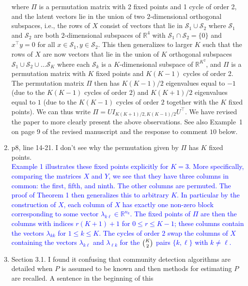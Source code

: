 \documentclass[
]{article}
\begin{document}
\begin{enumerate}
{  where $\Pi$ is a permutation matrix with 2 fixed points and 1 cycle of
  order 2, and the latent vectors lie in the union of two $2$-dimensional
  orthogonal subspaces, i.e., the rows of $X$ consist of
  vectors that lie in $\mathcal{S}_1 \cup \mathcal{S}_2$ where
  $\mathcal{S}_1$ and $\mathcal{S}_2$ are both $2$-dimensional
  subspaces of $\mathbb{R}^{4}$ with $\mathcal{S}_1 \cap \mathcal{S}_2 = \{0\}$ and $x^{\top} y
  = 0$ for all $x \in \mathcal{S}_1, y \in \mathcal{S}_2$. 
  This then generalizes to larger $K$ such that the rows of $X$ are now
  vectors that lie in the union of $K$ orthogonal subspaces
  $\mathcal{S}_1 \cup \mathcal{S}_2 \cup \dots \mathcal{S}_K$ where each
  $\mathcal{S}_k$ is a $K$-dimensional subspace of $\mathbb{R}^{K^2}$,
  and $\Pi$ is a permutation matrix with 
  $K$ fixed points and $K (K - 1)$ cycles of order 2. The permutation
  matrix $\Pi$ then has $K(K-1)/2$ eigenvalues equal to $-1$ (due
  to the $K(K-1)$ cycles of order $2$) and $K(K+1)/2$ eigenvalues equal
  to $1$ (due to the $K(K-1)$ cycles of order $2$ together with the $K$
  fixed points). We can thus write $\Pi = U I_{K(K+1)/2,K(K-1)/2}
  U^{\top}$. We have revised the paper to more clearly present the above
  observations. See also Example~1 on page 9 of the revised manuscript
  and the response to comment $10$ below.
  }
\item
  p8, line 14-21. I don't see why the permutation given by \(\Pi\) has
  \(K\) fixed points.\\
  \textcolor{blue}{
  Example 1 illustrates these fixed points explicitly for $K = 3$. 
  More specifically, comparing the matrices $X$ and $Y$, we see that
  they have three columns in common: the first, fifth, and ninth. 
  The other columns are permuted. The proof of Theorem 1 then
  generalizes this to arbitrary $K$. In particular by the construction
  of $X$, each column of $X$ has exactly one non-zero block
  corresponding to some vector $\lambda_{k \ell} \in \mathbb{R}^{n_k}$. The fixed
  points of $\Pi$ are then the columns with indices $r(K+1) +1 $ for $0 \leq r
  \leq K-1$; these columns contain the vectors $\lambda_{kk}$ for
  $1 \leq k \leq K$. The cycles of order $2$ swap the columns of $X$
  containing the vectors $\lambda_{k \ell}$ and $\lambda_{\ell k}$ for
  the $\tbinom{K}{2}$ pairs $\{k,\ell\}$ with $k \not = \ell$. 
  }
\item
  Section 3.1. I found it confusing that community detection algorithms
  are detailed when \(P\) is assumed to be known and then methods for
  estimating \(P\) are recalled. A sentence in the beginning of this

\end{enumerate}
\end{document}
